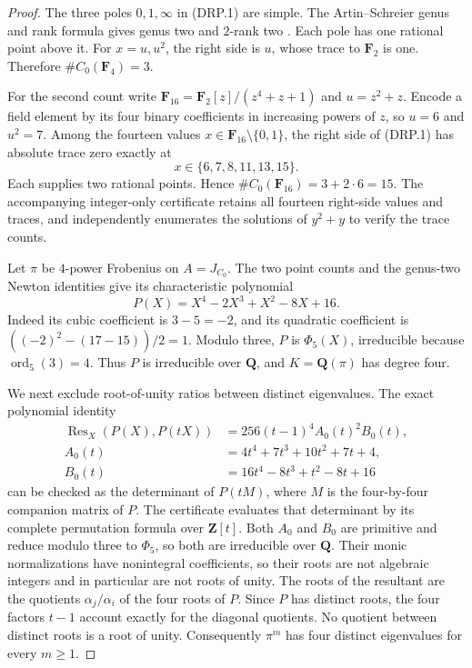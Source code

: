 \documentclass[11pt,a4paper]{article}
\begin{document}
\begin{proof}
The three poles $0,1,\infty$ in (DRP.1) are simple. The
Artin--Schreier genus and rank formula gives genus two and $2$-rank
two \cite[Lemma~2.6]{PriesZhu2012}. Each pole has one rational point
above it. For $x=u,u^2$, the right side is $u$, whose trace to
$\mathbf F_2$ is one. Therefore $\#C_0(\mathbf F_4)=3$.

For the second count write
$\mathbf F_{16}=\mathbf F_2[z]/(z^4+z+1)$ and $u=z^2+z$.
Encode a field element by its four binary coefficients in increasing
powers of $z$, so $u=6$ and $u^2=7$. Among the fourteen values
$x\in\mathbf F_{16}\setminus\{0,1\}$, the right side of
(DRP.1) has absolute trace zero exactly at
\[
                         x\in\{6,7,8,11,13,15\}.
 \tag{DRP.2}
\]
Each supplies two rational points. Hence
$\#C_0(\mathbf F_{16})=3+2\cdot6=15$.
The accompanying integer-only certificate retains all fourteen
right-side values and traces, and independently enumerates the
solutions of $y^2+y$ to verify the trace counts.

Let $\pi$ be $4$-power Frobenius on $A=J_{C_0}$. The two point
counts and the genus-two Newton identities give its characteristic
polynomial
\[
                    P(X)=X^4-2X^3+X^2-8X+16.
 \tag{DRP.3}
\]
Indeed its cubic coefficient is $3-5=-2$, and its quadratic
coefficient is $((-2)^2-(17-15))/2=1$.
Modulo three, $P$ is $\Phi_5(X)$, irreducible because
$\operatorname{ord}_5(3)=4$. Thus $P$ is irreducible over
$\mathbf Q$, and $K=\mathbf Q(\pi)$ has degree four.

We next exclude root-of-unity ratios between distinct eigenvalues.
The exact polynomial identity
\[
 \begin{aligned}
 \operatorname{Res}_X(P(X),P(tX))
   &=256(t-1)^4 A_0(t)^2 B_0(t),\\
 A_0(t)&=4t^4+7t^3+10t^2+7t+4,\\
 B_0(t)&=16t^4-8t^3+t^2-8t+16
 \end{aligned}
 \tag{DRP.4}
\]
can be checked as the determinant of $P(tM)$, where $M$ is the
four-by-four companion matrix of $P$. The certificate evaluates that
determinant by its complete permutation formula over $\mathbf Z[t]$.
Both $A_0$ and $B_0$ are primitive and reduce modulo three to
$\Phi_5$, so both are irreducible over $\mathbf Q$. Their monic
normalizations have nonintegral coefficients, so their roots are not
algebraic integers and in particular are not roots of unity.
The roots of the resultant are the quotients $\alpha_j/\alpha_i$
of the four roots of $P$. Since $P$ has distinct roots, the four
factors $t-1$ account exactly for the diagonal quotients. No quotient
between distinct roots is a root of unity. Consequently $\pi^m$
has four distinct eigenvalues for every $m\ge1$.


\end{proof}
\end{document}
